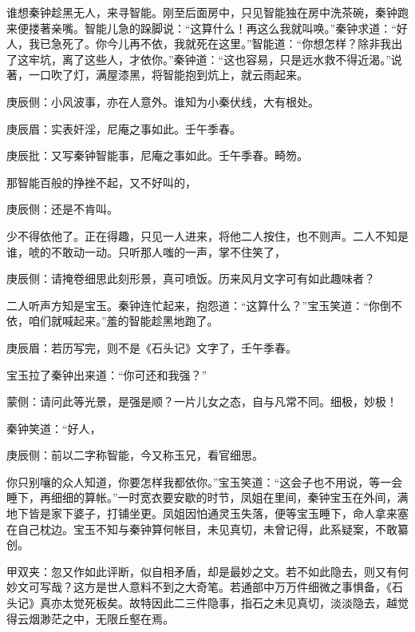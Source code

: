 \begin{parag}
    谁想秦钟趁黑无人，来寻智能。刚至后面房中，只见智能独在房中洗茶碗，秦钟跑来便搂著亲嘴。智能儿急的跺脚说：“这算什么！再这么我就叫唤。”秦钟求道：“好人，我已急死了。你今儿再不依，我就死在这里。”智能道：“你想怎样？除非我出了这牢坑，离了这些人，才依你。”秦钟道：“这也容易，只是远水救不得近渴。”说著，一口吹了灯，满屋漆黑，将智能抱到炕上，就云雨起来。\begin{note}庚辰侧：小风波事，亦在人意外。谁知为小秦伏线，大有根处。\end{note}\begin{note}庚辰眉：实表奸淫，尼庵之事如此。壬午季春。\end{note}\begin{note}庚辰批：又写秦钟智能事，尼庵之事如此。壬午季春。畸笏。\end{note}那智能百般的挣挫不起，又不好叫的，\begin{note}庚辰侧：还是不肯叫。\end{note}少不得依他了。正在得趣，只见一人进来，将他二人按住，也不则声。二人不知是谁，唬的不敢动一动。只听那人嗤的一声，掌不住笑了，\begin{note}庚辰侧：请掩卷细思此刻形景，真可喷饭。历来风月文字可有如此趣味者？\end{note}二人听声方知是宝玉。秦钟连忙起来，抱怨道：“这算什么？”宝玉笑道：“你倒不依，咱们就喊起来。”羞的智能趁黑地跑了。\begin{note}庚辰眉：若历写完，则不是《石头记》文字了，壬午季春。\end{note}宝玉拉了秦钟出来道：“你可还和我强？”\begin{note}蒙侧：请问此等光景，是强是顺？一片儿女之态，自与凡常不同。细极，妙极！\end{note}秦钟笑道：“好人，\begin{note}庚辰侧：前以二字称智能，今又称玉兄，看官细思。\end{note}你只别嚷的众人知道，你要怎样我都依你。”宝玉笑道：“这会子也不用说，等一会睡下，再细细的算帐。”一时宽衣要安歇的时节，凤姐在里间，秦钟宝玉在外间，满地下皆是家下婆子，打铺坐更。凤姐因怕通灵玉失落，便等宝玉睡下，命人拿来塞在自己枕边。宝玉不知与秦钟算何帐目，未见真切，未曾记得，此系疑案，不敢纂创。\begin{note}甲双夹：忽又作如此评断，似自相矛盾，却是最妙之文。若不如此隐去，则又有何妙文可写哉？这方是世人意料不到之大奇笔。若通部中万万件细微之事惧备，《石头记》真亦太觉死板矣。故特因此二三件隐事，指石之未见真切，淡淡隐去，越觉得云烟渺茫之中，无限丘壑在焉。\end{note}
\end{parag}


